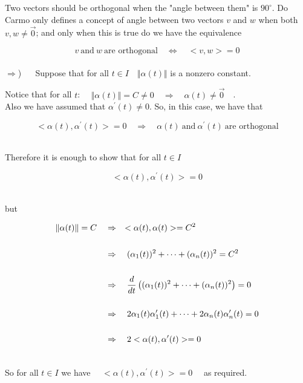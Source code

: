 \documentclass[12pt,letterpaper]{hmcpset}
\begin{document}
\begin{solution}
\quad\\
\quad\\

Two vectors should be orthogonal when the "angle between them" is $90^{\circ}$.   Do Carmo only defines a concept of angle between two vectors $v$ and $w$ when both $v, w \neq \vec0$; and only when this is true do we have the equivalence

\[ v \ \text{and}\ w \ \text{are orthogonal}\quad \iff \quad <v,w>=0\]\\


$\Rightarrow$) $ \quad$ Suppose that for all $t \in I\quad \Vert \alpha(t) \Vert$ is a nonzero constant.

 Notice that for all $t$: $ \quad\Vert \alpha(t)\Vert = C \neq 0 \quad \Rightarrow \quad \alpha(t) \neq \vec0 \quad$.\\

Also we have assumed that  $\alpha^{\prime}(t) \neq 0$.  So, in this case,  we have that

\[ <\alpha(t),  \alpha^{\prime}(t)> = 0\quad  \Rightarrow \quad \alpha(t) \ \text{and} \ \alpha^{\prime}(t) \ \text{are orthogonal}\]\

Therefore it is enough to show that for all $t \in I$

\[ <\alpha(t),  \alpha^{\prime}(t)> = 0\]\

but

\begin{align}
\Vert \alpha(t)\Vert = C \quad &\Rightarrow \quad  <\alpha(t), \alpha(t)> = C^2 \notag\\
&\quad \notag\\
&\Rightarrow\quad  (\alpha_1(t))^2 + \dots + (\alpha_n(t))^2 = C^2 \notag\\
&\quad \notag\\
&\Rightarrow \quad \frac{d}{dt} \left((\alpha_1(t))^2 + \dots + (\alpha_n(t))^2\right) =0 \notag\\
&\quad \notag\\
&\Rightarrow \quad  2\alpha_1(t)\alpha_1^{\prime}(t) + \dots + 2\alpha_n(t)\alpha_n^{\prime}(t)  = 0 \notag\\
&\quad \notag\\
&\Rightarrow \quad  2<\alpha(t),\alpha^{\prime}(t)> = 0 \notag\\
\notag
\end{align}

So for all $t \in I$ we have $\quad <\alpha(t),\alpha^{\prime}(t)> = 0 \quad$ as required.


\end{solution}
\end{document}
